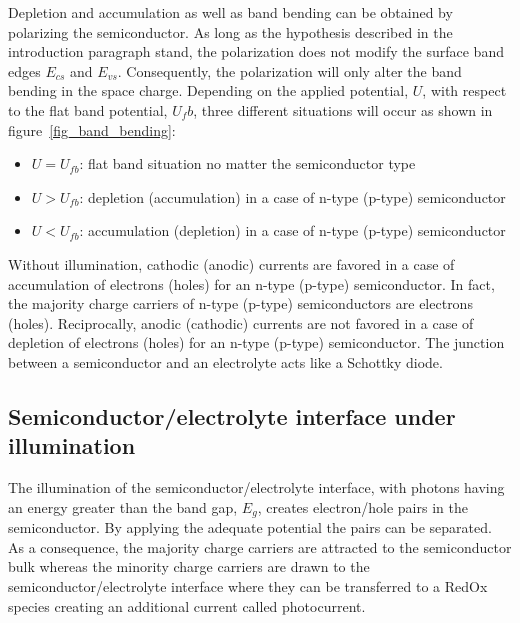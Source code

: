     
    

    Depletion and accumulation as well as band bending can be obtained 
    by polarizing the semiconductor. 
    As long as the hypothesis described in the introduction paragraph stand, 
    the polarization does not modify the surface band edges $E_{cs}$ and $E_{vs}$. 
    Consequently, the polarization will only alter the band bending in the space 
    charge. 
    Depending on the applied potential, $U$, with respect to the flat band 
    potential, $U_fb$, three different situations will occur as shown in 
    figure~\ref{fig_band_bending}:
    \begin{itemize}
    \item $U = U_{fb}$: flat band situation no matter the semiconductor type
    \item $U > U_{fb}$: depletion (accumulation) in a case of n-type (p-type) semiconductor  
    \item $U < U_{fb}$: accumulation (depletion) in a case of n-type (p-type) semiconductor
    \end{itemize}

    Without illumination, cathodic (anodic) currents are favored in a case of 
    accumulation of electrons (holes) for an n-type (p-type) semiconductor. 
    In fact, the majority charge carriers of n-type (p-type) semiconductors are 
    electrons (holes). 
    Reciprocally, anodic (cathodic) currents are not favored in a case of 
    depletion of electrons (holes) for an n-type (p-type) semiconductor. 
    The junction between a semiconductor and an electrolyte acts like a Schottky diode.

    
    \clearpage


\subsection{Semiconductor/electrolyte interface under illumination}
    The illumination of the semiconductor/electrolyte interface, 
    with photons having an energy greater than the band gap, $E_g$, creates 
    electron/hole pairs in the semiconductor. 
    By applying the adequate potential the pairs can be separated. 
    As a consequence, the majority charge carriers are attracted to the 
    semiconductor bulk whereas the minority charge carriers are drawn to the 
    semiconductor/electrolyte interface where they can be transferred to a RedOx 
    species creating an additional current called photocurrent.  

